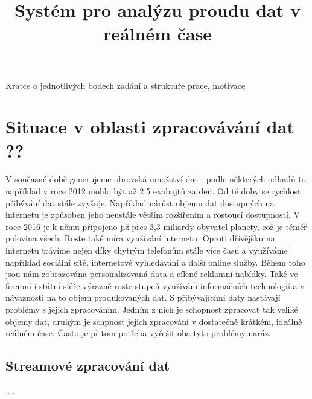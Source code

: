 \documentclass[thesis=B,czech]{FITthesis}[2012/06/26]
\title{Systém pro analýzu proudu dat v reálném čase}
\begin{document}

\begin{introduction}
	Kratce o jednotlivých bodech zadání a struktuře prace, motivace
	
\end{introduction}

%


\chapter{Situace v oblasti zpracovávání dat ??}
	V současné době generujeme obrovská množství dat - podle některých odhadů to například v roce 2012 mohlo být až 2,5 exabajtů za den\cite{bbc-bigdata}. Od té doby se rychlost přibývání dat stále zvyšuje. Například nárůst objemu dat dostupných na internetu je způsoben jeho neustále větším rozšířením a rostoucí dostupností. V  roce 2016 je k němu připojeno již přes 3,3 miliardy obyvatel planety\cite{internet-live-stats}, což je téměř polovina všech. Roste také míra využívání internetu. Oproti dřívějšku na internetu trávíme nejen díky chytrým telefonům stále více času a využíváme například sociální sítě, internetové vyhledávání a další online služby. Během toho jsou nám zobrazována personalizovaná data a cílené reklamní nabídky. Také ve firemní i státní sféře výrazně roste stupeň využívání informačních technologií a v návaznosti na to objem produkovaných dat. S přibývajícími daty nastávají problémy s jejich zpracováním. Jedním z nich je schopnost zpracovat tak veliké objemy dat, druhým je schpnost jejich zpracování v dostatečně krátkém, ideálně reálném čase. Často je přitom potřeba vyřešit oba tyto problémy naráz. 
		 
\section{Streamové zpracování dat}	
	....
\end{document}
